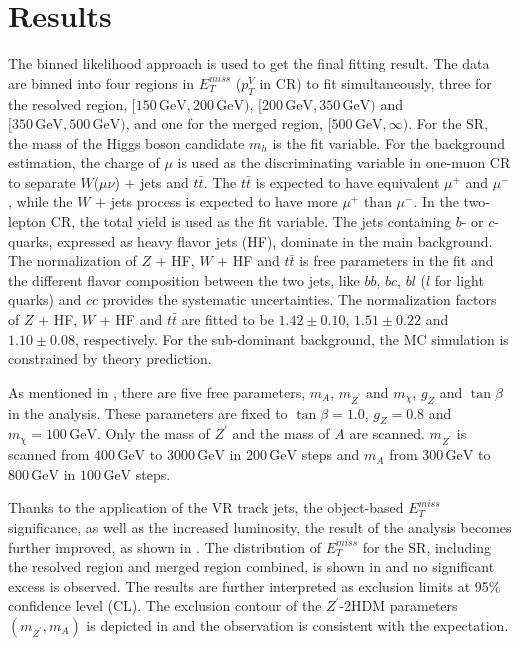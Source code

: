 \documentclass[class=NTHU_thesis, crop=false]{standalone}
\begin{document}
\chapter{Results}
\label{chap:result}
The binned likelihood approach is used to get the final fitting result. The data are binned into four regions in $E^{miss}_T$ ($p^V_T$ in CR) to fit simultaneously, three for the resolved region, $[150\, \mathrm{GeV}, 200\, \mathrm{GeV})$, $[200\, \mathrm{GeV}, 350\, \mathrm{GeV})$ and $[350\, \mathrm{GeV}, 500\, \mathrm{GeV})$, and one for the merged region, $[500\, \mathrm{GeV}, \infty)$. For the SR, the mass of the Higgs boson candidate $m_h$ is the fit variable. For the background estimation, the charge of $\mu$ is used as the discriminating variable in one-muon CR to separate $W$($\mu\nu$) + jets and $t\bar{t}$. The $t\bar{t}$ is expected to have equivalent $\mu^+$ and $\mu^-$, while the $W$ + jets process is expected to have more $\mu^+$ than $\mu^-$. In the two-lepton CR, the total yield is used as the fit variable. The jets containing $b$- or $c$-quarks, expressed as heavy flavor jets (HF), dominate in the main background. The normalization of $Z$ + HF, $W$ + HF and $t\bar{t}$ is free parameters in the fit and the different flavor composition between the two jets, like $bb$, $bc$, $bl$ ($l$ for light quarks) and $cc$ provides the systematic uncertainties. The normalization factors of $Z$ + HF, $W$ + HF and $t\bar{t}$ are fitted to be $1.42 \pm 0.10$, $1.51 \pm 0.22$ and $1.10 \pm 0.08$, respectively. For the sub-dominant background, the MC simulation is constrained by theory prediction.

As mentioned in , there are five free parameters, $m_A$, $m_{Z^\prime}$ and $m_\chi$, $g_Z$ and $\tan\beta$ in the analysis. These parameters are fixed to $\tan\beta = 1.0$, $g_Z = 0.8$ and $m_\chi = 100\, \mathrm{GeV}$. Only the mass of $Z^\prime$ and the mass of $A$ are scanned. $m_{Z^\prime}$ is scanned from $400\, \mathrm{GeV}$ to $3000\, \mathrm{GeV}$ in $200\, \mathrm{GeV}$ steps and $m_A$ from $300\, \mathrm{GeV}$ to $800\, \mathrm{GeV}$ in $100\, \mathrm{GeV}$ steps.

Thanks to the application of the VR track jets, the object-based $E^{miss}_T$ significance, as well as the increased luminosity, the result of the analysis becomes further improved, as shown in . The distribution of $E^{miss}_T$ for the SR, including the resolved region and merged region combined, is shown in  and no significant excess is observed. The results are further interpreted as exclusion limits at 95\% confidence level (CL). The exclusion contour of the $Z^\prime$-2HDM parameters $(m_{Z^\prime}, m_A)$ is depicted in  and the observation is consistent with the expectation.
\end{document}
